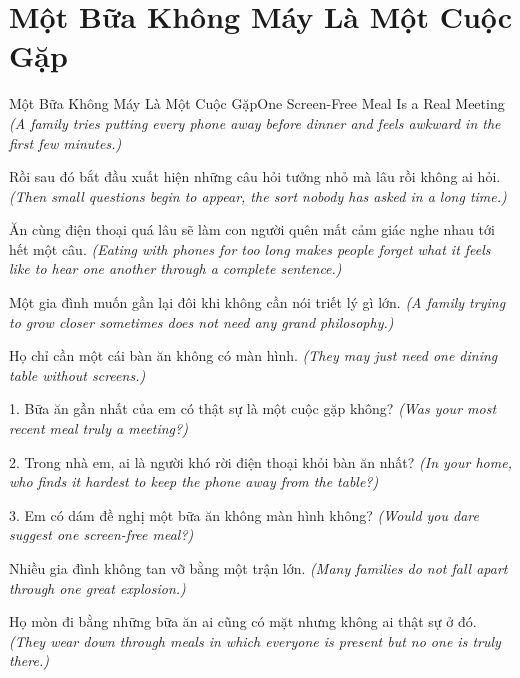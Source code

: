 \section{Một Bữa Không Máy Là Một Cuộc Gặp}
\begin{truyen}{Một Bữa Không Máy Là Một Cuộc Gặp}{One Screen-Free Meal Is a Real Meeting}
\textit{(A family tries putting every phone away before dinner and feels awkward in the first few minutes.)}

Rồi sau đó bắt đầu xuất hiện những câu hỏi tưởng nhỏ mà lâu rồi không ai hỏi.
\textit{(Then small questions begin to appear, the sort nobody has asked in a long time.)}

\end{truyen}

\begin{baihoc}
Ăn cùng điện thoại quá lâu sẽ làm con người quên mất cảm giác nghe nhau tới hết một câu.
\textit{(Eating with phones for too long makes people forget what it feels like to hear one another through a complete sentence.)}

Một gia đình muốn gần lại đôi khi không cần nói triết lý gì lớn.
\textit{(A family trying to grow closer sometimes does not need any grand philosophy.)}

Họ chỉ cần một cái bàn ăn không có màn hình.
\textit{(They may just need one dining table without screens.)}
\end{baihoc}

\begin{tuhocnhanh}
1. Bữa ăn gần nhất của em có thật sự là một cuộc gặp không? \textit{(Was your most recent meal truly a meeting?)}

2. Trong nhà em, ai là người khó rời điện thoại khỏi bàn ăn nhất? \textit{(In your home, who finds it hardest to keep the phone away from the table?)}

3. Em có dám đề nghị một bữa ăn không màn hình không? \textit{(Would you dare suggest one screen-free meal?)}
\end{tuhocnhanh}

\begin{tongketchuong}
Nhiều gia đình không tan vỡ bằng một trận lớn.
\textit{(Many families do not fall apart through one great explosion.)}

Họ mòn đi bằng những bữa ăn ai cũng có mặt nhưng không ai thật sự ở đó.
\textit{(They wear down through meals in which everyone is present but no one is truly there.)}
\end{tongketchuong}

\ngancach